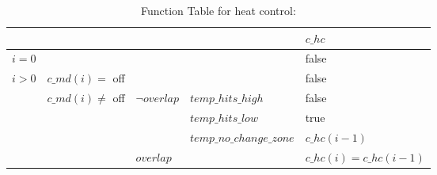 \documentclass[fontsize=12pt,paper=letter,twoside]{scrartcl}
\begin{document}
\begin{table}[]
\centering
\begin{tabular}{llll|l|}
\cline{5-5}
                                                        &                                                       &                                                                        &                        & $c\_hc$                 \\ \hline
\multicolumn{4}{|l|}{$i = 0$}                                                                                                                                                                                       & false      \\ \hline
\multicolumn{1}{|l|}{\multirow{5}{*}{$i > 0$}} & \multicolumn{3}{l|}{$c\_md(i) =$ off}                                                                                                                     & false      \\ \cline{2-5}
\multicolumn{1}{|l|}{}                                  & \multicolumn{1}{l|}{\multirow{4}{*}{$c\_md(i) \not =$ off}} & \multicolumn{1}{l|}{\multirow{3}{*}{$\neg overlap$ \footnotemark}} & $temp\_hits\_high$ \footnotemark      & false      \\ \cline{4-5}
\multicolumn{1}{|l|}{}                                  & \multicolumn{1}{l|}{}                                 & \multicolumn{1}{l|}{}                                                  & $temp\_hits\_low$ \footnotemark       &  true       \\ \cline{4-5}
\multicolumn{1}{|l|}{}                                  & \multicolumn{1}{l|}{}                                 & \multicolumn{1}{l|}{}                                                  & $temp\_no\_change\_zone$ \footnotemark & $c\_hc(i-1)$ \\ \cline{3-5}
\multicolumn{1}{|l|}{}                                  & \multicolumn{1}{l|}{}                                 & \multicolumn{2}{l|}{$overlap$}                                               & $c\_hc(i) = c\_hc(i-1)$ \\ \hline
\end{tabular}
\caption{Function Table for heat control: }
\label{fthcl}
\end{table}
\end{document}
